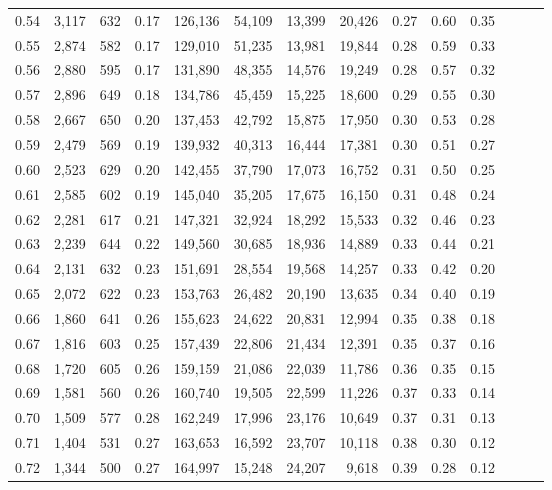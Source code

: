 \begin{tabular}{rrrrrrrrrrrrrr}
0.54 &  3,117 &  632 &  0.17 &  126,136 &   54,109 &  13,399 &  20,426 &  0.27 &  0.60 &      0.35 \\
0.55 &  2,874 &  582 &  0.17 &  129,010 &   51,235 &  13,981 &  19,844 &  0.28 &  0.59 &      0.33 \\
0.56 &  2,880 &  595 &  0.17 &  131,890 &   48,355 &  14,576 &  19,249 &  0.28 &  0.57 &      0.32 \\
0.57 &  2,896 &  649 &  0.18 &  134,786 &   45,459 &  15,225 &  18,600 &  0.29 &  0.55 &      0.30 \\
0.58 &  2,667 &  650 &  0.20 &  137,453 &   42,792 &  15,875 &  17,950 &  0.30 &  0.53 &      0.28 \\
0.59 &  2,479 &  569 &  0.19 &  139,932 &   40,313 &  16,444 &  17,381 &  0.30 &  0.51 &      0.27 \\
0.60 &  2,523 &  629 &  0.20 &  142,455 &   37,790 &  17,073 &  16,752 &  0.31 &  0.50 &      0.25 \\
0.61 &  2,585 &  602 &  0.19 &  145,040 &   35,205 &  17,675 &  16,150 &  0.31 &  0.48 &      0.24 \\
0.62 &  2,281 &  617 &  0.21 &  147,321 &   32,924 &  18,292 &  15,533 &  0.32 &  0.46 &      0.23 \\
0.63 &  2,239 &  644 &  0.22 &  149,560 &   30,685 &  18,936 &  14,889 &  0.33 &  0.44 &      0.21 \\
0.64 &  2,131 &  632 &  0.23 &  151,691 &   28,554 &  19,568 &  14,257 &  0.33 &  0.42 &      0.20 \\
0.65 &  2,072 &  622 &  0.23 &  153,763 &   26,482 &  20,190 &  13,635 &  0.34 &  0.40 &      0.19 \\
0.66 &  1,860 &  641 &  0.26 &  155,623 &   24,622 &  20,831 &  12,994 &  0.35 &  0.38 &      0.18 \\
0.67 &  1,816 &  603 &  0.25 &  157,439 &   22,806 &  21,434 &  12,391 &  0.35 &  0.37 &      0.16 \\
0.68 &  1,720 &  605 &  0.26 &  159,159 &   21,086 &  22,039 &  11,786 &  0.36 &  0.35 &      0.15 \\
0.69 &  1,581 &  560 &  0.26 &  160,740 &   19,505 &  22,599 &  11,226 &  0.37 &  0.33 &      0.14 \\
0.70 &  1,509 &  577 &  0.28 &  162,249 &   17,996 &  23,176 &  10,649 &  0.37 &  0.31 &      0.13 \\
0.71 &  1,404 &  531 &  0.27 &  163,653 &   16,592 &  23,707 &  10,118 &  0.38 &  0.30 &      0.12 \\
0.72 &  1,344 &  500 &  0.27 &  164,997 &   15,248 &  24,207 &   9,618 &  0.39 &  0.28 &      0.12 \\

\end{tabular}
